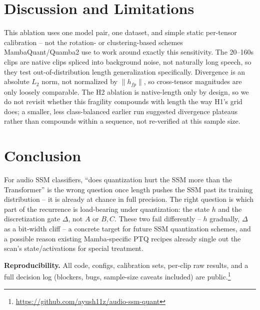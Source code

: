 \documentclass[10pt,twocolumn]{article}
\begin{document}
\section{Discussion and Limitations}

This ablation uses one model pair, one dataset, and simple static per-tensor calibration -- not the rotation- or clustering-based schemes MambaQuant/Quamba2 use to work around exactly this sensitivity. The 20--160s clips are native clips spliced into background noise, not naturally long speech, so they test out-of-distribution length generalization specifically. Divergence is an absolute $L_2$ norm, not normalized by $\lVert h_{fp}\rVert$, so cross-tensor magnitudes are only loosely comparable. The H2 ablation is native-length only by design, so we do not revisit whether this fragility compounds with length the way H1's grid does; a smaller, less class-balanced earlier run suggested divergence plateaus rather than compounds within a sequence, not re-verified at this sample size.

\section{Conclusion}

For audio SSM classifiers, ``does quantization hurt the SSM more than the Transformer'' is the wrong question once length pushes the SSM past its training distribution -- it is already at chance in full precision. The right question is which part of the recurrence is load-bearing under quantization: the state $h$ and the discretization gate $\Delta$, not $A$ or $B,C$. These two fail differently -- $h$ gradually, $\Delta$ as a bit-width cliff -- a concrete target for future SSM quantization schemes, and a possible reason existing Mamba-specific PTQ recipes already single out the scan's state/activations for special treatment.

\textbf{Reproducibility.} All code, configs, calibration sets, per-clip raw results, and a full decision log (blockers, bugs, sample-size caveats included) are public.\footnote{\url{https://github.com/ayush11z/audio-ssm-quant}}

{\small


}
\end{document}
